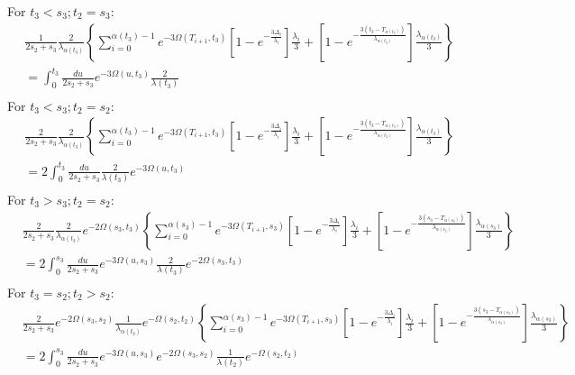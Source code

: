\documentclass{article}
\begin{document}
For $t_3<s_3; t_2=s_3$:
\begin{align*}
    &\frac{1}{2s_2+s_3}\frac{2}{\lambda_{\alpha(t_3)}}
    \left\{\sum_{i=0}^{\alpha(t_3)-1}e^{-3\Omega(T_{i+1},t_3)}
        \left[1-e^{-\frac{3\Delta_i}{\lambda_i}}\right]\frac{\lambda_i}{3}+
    \left[1-e^{-\frac{3\left(t_3-T_{\alpha(t_3)}\right)}{\lambda_{\alpha(t_3)}}}\right]
        \frac{\lambda_{\alpha(t_3)}}{3}\right\}\\
    &=\int_0^{t_3}\frac{du}{2s_2+s_3}e^{-3\Omega(u,t_3)}\frac{2}{\lambda(t_3)}\\
\end{align*}
For $t_3<s_3; t_2=s_2$:
\begin{align*}
    &\frac{2}{2s_2+s_3}\frac{2}{\lambda_{\alpha(t_3)}}
    \left\{\sum_{i=0}^{\alpha(t_3)-1}e^{-3\Omega(T_{i+1},t_3)}
        \left[1-e^{-\frac{3\Delta_i}{\lambda_i}}\right]\frac{\lambda_i}{3}+
    \left[1-e^{-\frac{3\left(t_3-T_{\alpha(t_3)}\right)}{\lambda_{\alpha(t_3)}}}\right]
        \frac{\lambda_{\alpha(t_3)}}{3}\right\}\\
    &=2\int_0^{t_3}\frac{du}{2s_2+s_3}\frac{2}{\lambda(t_3)}e^{-3\Omega(u,t_3)}\\
\end{align*}
For $t_3>s_3; t_2=s_2$:
\begin{align*}
    &\frac{2}{2s_2+s_3}\frac{2}{\lambda_{\alpha(t_3)}}e^{-2\Omega(s_3,t_3)}
    \left\{\sum_{i=0}^{\alpha(s_3)-1}e^{-3\Omega(T_{i+1},s_3)}
        \left[1-e^{-\frac{3\Delta_i}{\lambda_i}}\right]\frac{\lambda_i}{3}+
    \left[1-e^{-\frac{3\left(s_3-T_{\alpha(s_3)}\right)}{\lambda_{\alpha(s_3)}}}\right]
        \frac{\lambda_{\alpha(s_3)}}{3}\right\}\\
    &=2\int_0^{s_3}\frac{du}{2s_2+s_3}e^{-3\Omega(u,s_3)}\frac{2}{\lambda(t_3)}e^{-2\Omega(s_3,t_3)}\\
\end{align*}
For $t_3=s_2; t_2>s_2$:
\begin{align*}
    &\frac{2}{2s_2+s_3}e^{-2\Omega(s_3,s_2)}\frac{1}{\lambda_{\alpha(t_2)}}e^{-\Omega(s_2,t_2)}
    \left\{\sum_{i=0}^{\alpha(s_3)-1}e^{-3\Omega(T_{i+1},s_3)}
        \left[1-e^{-\frac{3\Delta_i}{\lambda_i}}\right]\frac{\lambda_i}{3}+
    \left[1-e^{-\frac{3\left(s_3-T_{\alpha(s_3)}\right)}{\lambda_{\alpha(s_3)}}}\right]
        \frac{\lambda_{\alpha(s_3)}}{3}\right\}\\
    &=2\int_0^{s_3}\frac{du}{2s_2+s_3}e^{-3\Omega(u,s_3)}e^{-2\Omega(s_3,s_2)}\frac{1}{\lambda(t_2)}e^{-\Omega(s_2,t_2)}
\end{align*}
\end{document}
